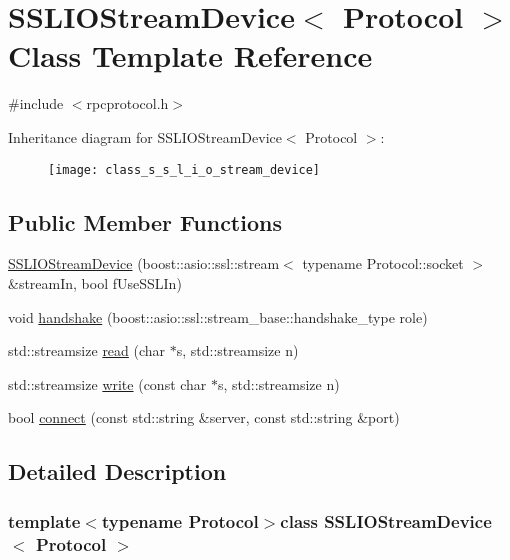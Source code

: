 \hypertarget{class_s_s_l_i_o_stream_device}{}\section{S\+S\+L\+I\+O\+Stream\+Device$<$ Protocol $>$ Class Template Reference}
\label{class_s_s_l_i_o_stream_device}


{\ttfamily \#include $<$rpcprotocol.\+h$>$}

Inheritance diagram for S\+S\+L\+I\+O\+Stream\+Device$<$ Protocol $>$\+:\begin{figure}[H]
\begin{center}
\leavevmode
\texttt{[image: class\_s\_s\_l\_i\_o\_stream\_device]}
\end{center}
\end{figure}
\subsection*{Public Member Functions}
\begin{DoxyCompactItemize}
\item 
\hyperlink{class_s_s_l_i_o_stream_device_a603e5709babdeaaa68c159a2895d7f2e}{S\+S\+L\+I\+O\+Stream\+Device} (boost\+::asio\+::ssl\+::stream$<$ typename Protocol\+::socket $>$ \&stream\+In, bool f\+Use\+S\+S\+L\+In)
\item 
void \hyperlink{class_s_s_l_i_o_stream_device_a6607d02de410f1c731bf1dcf3bac9bb5}{handshake} (boost\+::asio\+::ssl\+::stream\+\_\+base\+::handshake\+\_\+type role)
\item 
std\+::streamsize \hyperlink{class_s_s_l_i_o_stream_device_a8beb626f163adac311a5ec507c3e495a}{read} (char $\ast$s, std\+::streamsize n)
\item 
std\+::streamsize \hyperlink{class_s_s_l_i_o_stream_device_aa4bfad893484ffdf9dbcdce97c462ad0}{write} (const char $\ast$s, std\+::streamsize n)
\item 
bool \hyperlink{class_s_s_l_i_o_stream_device_acdded14a6c79e263989ebf8aea392405}{connect} (const std\+::string \&server, const std\+::string \&port)
\end{DoxyCompactItemize}


\subsection{Detailed Description}
\subsubsection*{template$<$typename Protocol$>$class S\+S\+L\+I\+O\+Stream\+Device$<$ Protocol $>$}

